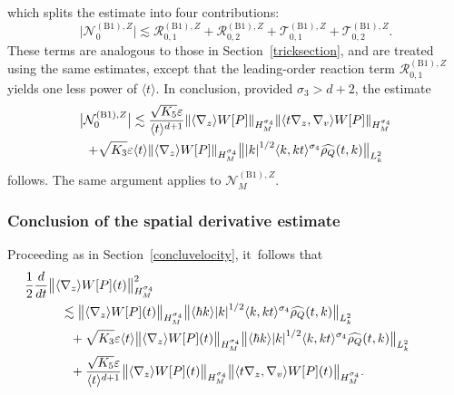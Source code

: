 \documentclass[JEP,XML,SOM,Unicode]{cedram}
\newcommand{\bnorm}[1]{\bigl\|#1\bigr\|}
\newcommand{\babs}[1]{\bigl|#1\bigr|}
\theoremstyle{plain}
\theoremstyle{remark}
\newcommand{\ak}{\abs{k}}
\newcommand{\half}{\frac{1}{2}}
\newcommand{\jb}[1]{\langle#1\rangle}
\newcommand{\ep}{\varepsilon}
\begin{document}
which splits the estimate into four contributions: \[\babs{\mathcal{N}_0^{\mathrm{(B1)},Z}}\lesssim \mathcal{R}_{0,1}^{\mathrm{(B1)},Z}+\mathcal{R}_{0,2}^{\mathrm{(B1)},Z}+\mathcal{T}_{0,1}^{\mathrm{(B1)},Z}+\mathcal{T}_{0,2}^{\mathrm{(B1)},Z}.\]These terms are analogous to those in Section~\ref{tricksection}, and are treated using the same estimates, except that the leading-order reaction term $\mathcal{R}_{0,1}^{\mathrm{(B1)},Z}$ yields one less power of $\jb{t}$. In conclusion, provided $\sigma_3 > d + 2$, the estimate
\begin{multline*}
\babs{\mathcal{N}_0^{\mathrm{(B1)},Z}}\lesssim\frac{\sqrt{K_5}\ep}{\jb{t}^{d+1}}\norm{\jb{\nabla_z}W[P]}_{H^{\sigma_4}_M}\norm{\jb{t\nabla_z,\nabla_v}W[P]}_{H^{\sigma_4}_M}\\
+\sqrt{K_3}\ep\jb{t}\norm{\jb{\nabla_z}W[P]}_{H^{\sigma_4}_M}\bnorm{\ak^{1/2}\jb{k,kt}^{\sigma_4}\widehat{\rho_Q}(t,k)}_{L^2_k}
\end{multline*}
follows. The same argument applies to $\mathcal{N}_M^{\mathrm{(B1)},Z}$.

\subsubsection{Conclusion of the spatial derivative estimate}
Proceeding as in Section~\ref{concluvelocity}, it~follows that
\begin{align*}
&\hspace{-1cm}\half\frac{d}{dt}\bnorm{\jb{\nabla_z}{W[P]}(t)}_{H^{\sigma_4}_M}^2\\
&\lesssim\bnorm{\jb{\nabla_z}{W[P](t)}}_{H^{\sigma_4}_M}\bnorm{\jb{\hbar k}\ak^{1/2}\jb{k,kt}^{\sigma_4}\widehat{\rho_Q}(t,k)}_{L^2_{k}}\\
&\hspace{0.25cm}+\sqrt{K_3}\ep\jb{t}\bnorm{\jb{\nabla_z}W[P](t)}_{H^{\sigma_4}_M}\bnorm{\jb{\hbar k}\ak^{1/2}\jb{k,kt}^{\sigma_4}\widehat{\rho_Q}(t,k)}_{L^2_k}\\
&\hspace{0.25cm}+\frac{\sqrt{K_5}\ep}{\jb{t}^{d+1}}\bnorm{\jb{\nabla_z}W[P](t)}_{H^{\sigma_4}_M}\bnorm{\jb{t\nabla_z,\nabla_v}W[P](t)}_{H^{\sigma_4}_M}.
\end{align*}
\end{document}
